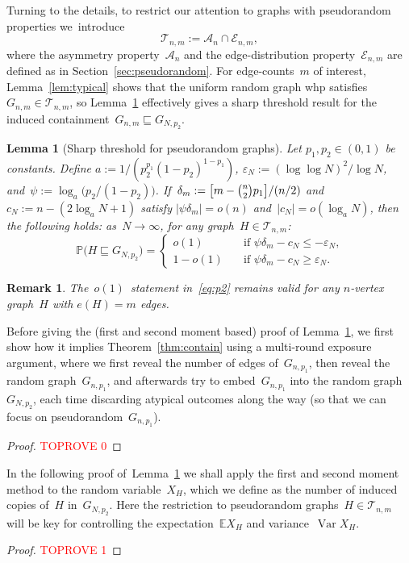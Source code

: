 \documentclass{article}
\newcommand{\eps}{\varepsilon}
\renewcommand{\Pr}{\mathbb{P}}
\newcommand{\E}{\mathbb{E}}
\newcommand{\cA}{\mathcal{A}}
\newcommand{\cE}{\mathcal{E}}
\newcommand{\cT}{\mathcal{T}}
\newcommand\abs[1]{\left|#1\right|}
\newcommand\Var{\operatorname{Var}}
\newcommand{\isub}{\sqsubseteq}
\newtheorem{lemma}[thm]{Lemma}
\newtheorem{remark}{Remark}
\newcommand\bigpar[1]{\bigl(#1\bigr)}
\newcommand\bigsqpar[1]{\bigl[#1\bigr]}
\newcommand{\refT}[1]{Theorem~\ref{#1}}
\newcommand{\refL}[1]{Lemma~\ref{#1}}
\newcommand{\refS}[1]{Section~\ref{#1}}
\begin{document}
Turning to the details, to restrict our attention to graphs with pseudorandom properties 
we~introduce
\begin{equation}\label{def:Tnm}
\cT_{n,m} := \cA_n \cap \cE_{n,m},
\end{equation}
where the asymmetry property~$\cA_n$ and the edge-distribution property~$\cE_{n,m}$ are defined as in \refS{sec:pseudorandom}. 
For edge-counts~$m$ of interest, 
\refL{lem:typical} shows that the uniform random graph whp satisfies~$G_{n,m} \in \cT_{n,m}$, 
so \refL{lem:maincontain}  effectively gives a sharp threshold result for the induced containment~$G_{n,m} \isub G_{N,p_2}$. 
\begin{lemma}[Sharp threshold for pseudorandom graphs]\label{lem:maincontain}
Let $p_1,p_2\in (0,1)$ be constants.
Define $a := {1/(p_2^{p_1}(1-p_2)^{1-p_1})}$, $\eps_N:={(\log \log N)^2/\log N}$, and~$\psi:={\log_a\bigpar{p_2/(1-p_2)}}$.
If~$\delta_m := {\bigsqpar{m-\tbinom{n}{2}p_1}/(n/2)}$ 
and~$c_N:={n-(2\log_a N + 1)}$
satisfy ${\abs{\psi \delta_m} = o(n)}$ and~${\abs{c_N} = o(\log_a N)}$, then the following holds: as~$N \to \infty$, for any graph~$H \in \cT_{n,m}$:
 \begin{equation}\label{eq:p2}
\Pr\bigpar{H\isub G_{N,p_2}} = \begin{cases} o(1) \quad & \text{if~$\psi \delta_m-c_N \le -\eps_N$,}\\ 
1-o(1) \quad & \text{if~$\psi \delta_m-c_N \ge \eps_N$.}\end{cases}
\end{equation}
\end{lemma}
\begin{remark}\label{rem:0-statement}
The~\mbox{$o(1)$ statement} in~\eqref{eq:p2} remains valid for any $n$-vertex graph~$H$ with $e(H)=m$ edges. 
\end{remark}
Before giving the (first and second moment based) proof of \refL{lem:maincontain}, we first show how it implies \refT{thm:contain} using a multi-round exposure argument, where we first reveal the number of edges of~$G_{n,p_1}$, 
then reveal the random graph~$G_{n,p_1}$, and afterwards try to embed~$G_{n,p_1}$ into the random graph~$G_{N,p_2}$, each time discarding atypical outcomes along the way (so that we can focus on pseudorandom~$G_{n,p_1}$). 
\begin{proof}\textcolor{red}{TOPROVE 0}\end{proof}


In the following proof of~\refL{lem:maincontain} we shall apply the first and second moment method to the random variable~$X_H$, 
which we define as the number of induced copies of~$H$ in~$G_{N,p_2}$. 
Here the restriction to pseudorandom graphs~$H \in \cT_{n,m}$ will be key for controlling the expectation~$\E X_H$ and variance~$\Var X_H$.  
\begin{proof}\textcolor{red}{TOPROVE 1}\end{proof}
\end{document}
